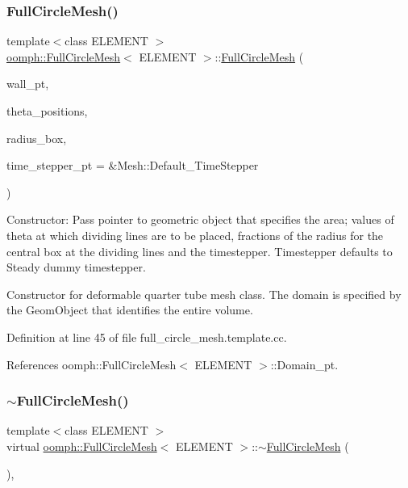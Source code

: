 \subsubsection{\texorpdfstring{Full\+Circle\+Mesh()}{FullCircleMesh()}}
{\footnotesize\ttfamily template$<$class E\+L\+E\+M\+E\+NT $>$ \\
\hyperlink{classoomph_1_1FullCircleMesh}{oomph\+::\+Full\+Circle\+Mesh}$<$ E\+L\+E\+M\+E\+NT $>$\+::\hyperlink{classoomph_1_1FullCircleMesh}{Full\+Circle\+Mesh} (\begin{DoxyParamCaption}\item[{Geom\+Object $\ast$}]{wall\+\_\+pt,  }\item[{const Vector$<$ double $>$ \&}]{theta\+\_\+positions,  }\item[{const Vector$<$ double $>$ \&}]{radius\+\_\+box,  }\item[{Time\+Stepper $\ast$}]{time\+\_\+stepper\+\_\+pt = {\ttfamily \&Mesh\+:\+:Default\+\_\+TimeStepper} }\end{DoxyParamCaption})}



Constructor\+: Pass pointer to geometric object that specifies the area; values of theta at which dividing lines are to be placed, fractions of the radius for the central box at the dividing lines and the timestepper. Timestepper defaults to Steady dummy timestepper. 

Constructor for deformable quarter tube mesh class. The domain is specified by the Geom\+Object that identifies the entire volume. 

Definition at line 45 of file full\+\_\+circle\+\_\+mesh.\+template.\+cc.



References oomph\+::\+Full\+Circle\+Mesh$<$ E\+L\+E\+M\+E\+N\+T $>$\+::\+Domain\+\_\+pt.

\mbox{\label{classoomph_1_1FullCircleMesh_a7acf128e8eeaefcd79b5b3cd5e9cbaa9}} 
\subsubsection{\texorpdfstring{$\sim$\+Full\+Circle\+Mesh()}{~FullCircleMesh()}}
{\footnotesize\ttfamily template$<$class E\+L\+E\+M\+E\+NT $>$ \\
virtual \hyperlink{classoomph_1_1FullCircleMesh}{oomph\+::\+Full\+Circle\+Mesh}$<$ E\+L\+E\+M\+E\+NT $>$\+::$\sim$\hyperlink{classoomph_1_1FullCircleMesh}{Full\+Circle\+Mesh} (\begin{DoxyParamCaption}{ }\end{DoxyParamCaption})\hspace{0.3cm}{\ttfamily [inline]}, {\ttfamily [virtual]}}



